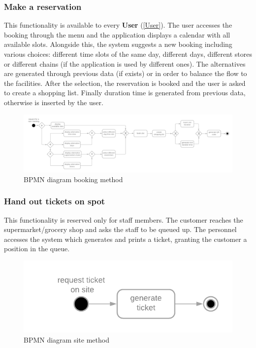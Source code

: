 \documentclass[table, 12pt]{article}
\begin{document}
\begin{flushleft}
    \subsubsection{Make a reservation}
    \label{book_a_visit}
    This functionality is available to every \textbf{User} (\ref{User}). The user accesses the booking through the menu and the application displays a calendar with all available slots. Alongside this, the system suggests a new booking including various choices: different time slots of the same day, different days, different stores or different chains (if the application is used by different ones). The alternatives are generated through previous data (if exists) or in order to balance the flow to the facilities. After the selection, the reservation is booked and the user is asked to create a shopping list. Finally duration time is generated from previous data, otherwise is inserted by the user.
    \begin{figure}[H]
        \begin{center}
            \includegraphics[scale=0.15]{assets/function-book-a-visit.png}
            \caption{BPMN diagram booking method}
        \end{center}
    \end{figure}
    \subsubsection{Hand out tickets on spot}

    This functionality is reserved only for staff members. The customer reaches the supermarket/grocery shop and asks the staff to be queued up. The personnel accesses the system which generates and prints a ticket, granting the customer a position in the queue.
    \begin{figure}[H]
        \begin{center}
            \includegraphics[scale=0.5]{assets/function-hand-up.png}
            \caption{BPMN diagram site method}
        \end{center}
    \end{figure}


\end{flushleft}
\end{document}

